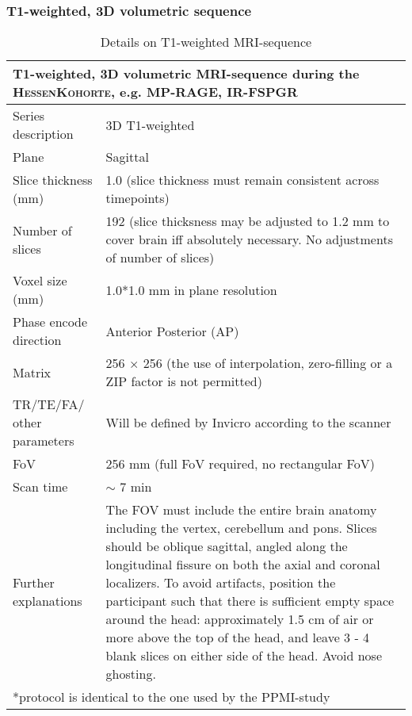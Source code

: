 \documentclass[
	a4paper, 
	11.5pt,
	headings=small, 
	twoside, 
	titlepage=firstiscover, 
 	pagesize=auto,
  	version=last,
	open=any,
	BCOR=14mm,
  	chapterprefix=false]{scrbook}
\begin{document}
\subsubsection{T1-weighted, 3D volumetric sequence}
\begin{table}[H]
\caption{Details on T1-weighted \ac{MRI}-sequence}
\begin{tabularx}{1\textwidth}{@{}X *{1}{X}@{}}
\toprule
\multicolumn{2}{l}{\textbf{T1-weighted, 3D volumetric \ac{MRI}-sequence during the \textsc{HessenKohorte}, e.g. \ac{MP-RAGE}, \ac{IR-FSPGR}}} \\
\midrule
Series description 								& 3D T1-weighted 											\\
Plane	 									& Sagittal 												\\
Slice thickness (mm) 							& 1.0 (slice thickness must remain consistent across timepoints) 	\\
Number of slices 								& 192 (slice thicksness may be adjusted to 1.2 mm to cover brain iff absolutely necessary. No adjustments of number of slices) 			\\
Voxel size (mm) 								& 1.0*1.0 mm in plane resolution \\
Phase encode direction 						& Anterior Posterior (AP) 			\\
Matrix										& 256 $\times$ 256 (the use of interpolation, zero-filling or a ZIP factor is not permitted)\\
TR/TE/FA/ other parameters 					& Will be defined by Invicro according to the scanner\\
FoV		 									& 256 mm (full FoV required, no rectangular FoV)\\
Scan time 									& $\sim$ 7 min\\
Further explanations 							& The FOV must include the entire brain anatomy including the vertex, cerebellum and pons. Slices should be oblique sagittal, angled along the longitudinal fissure on both the axial and coronal localizers. To avoid artifacts, position the participant such that there is sufficient empty space around the head: approximately 1.5 cm of air or more above the top of the head, and leave 3 - 4 blank slices on either side of the head. Avoid nose ghosting.\\
\bottomrule
\multicolumn{2}{l}{\footnotesize{*protocol is identical to the one used by the \ac{PPMI}-study}}
\end{tabularx}
\end{table}
\end{document}

